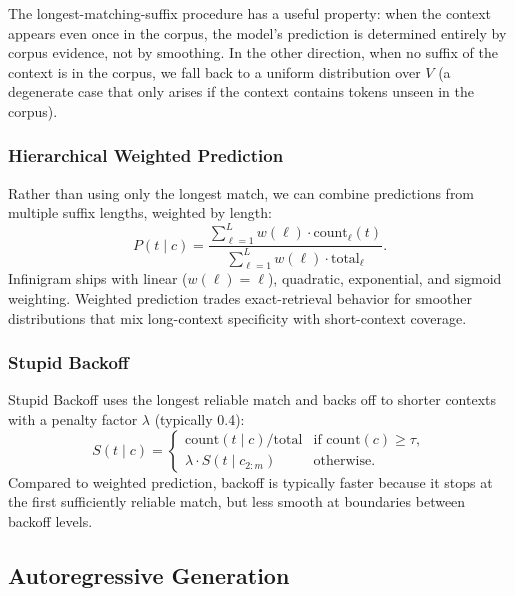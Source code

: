 \documentclass[11pt]{article}
\begin{document}
The longest-matching-suffix procedure has a useful property: when the context appears even once in the corpus, the model's prediction is determined entirely by corpus evidence, not by smoothing. In the other direction, when no suffix of the context is in the corpus, we fall back to a uniform distribution over $V$ (a degenerate case that only arises if the context contains tokens unseen in the corpus).

\subsubsection{Hierarchical Weighted Prediction}

Rather than using only the longest match, we can combine predictions from multiple suffix lengths, weighted by length:
\begin{equation}
    P(t \mid c) = \frac{\sum_{\ell=1}^{L} w(\ell) \cdot \mathrm{count}_\ell(t)}{\sum_{\ell=1}^{L} w(\ell) \cdot \mathrm{total}_\ell}.
\end{equation}
Infinigram ships with linear ($w(\ell) = \ell$), quadratic, exponential, and sigmoid weighting. Weighted prediction trades exact-retrieval behavior for smoother distributions that mix long-context specificity with short-context coverage.

\subsubsection{Stupid Backoff}

Stupid Backoff \citep{brants2007large} uses the longest reliable match and backs off to shorter contexts with a penalty factor $\lambda$ (typically 0.4):
\begin{equation}
    S(t \mid c) = \begin{cases}
        \mathrm{count}(t \mid c) / \mathrm{total} & \text{if } \mathrm{count}(c) \geq \tau, \\
        \lambda \cdot S(t \mid c_{2:m}) & \text{otherwise.}
    \end{cases}
\end{equation}
Compared to weighted prediction, backoff is typically faster because it stops at the first sufficiently reliable match, but less smooth at boundaries between backoff levels.

\subsection{Autoregressive Generation}
\end{document}
